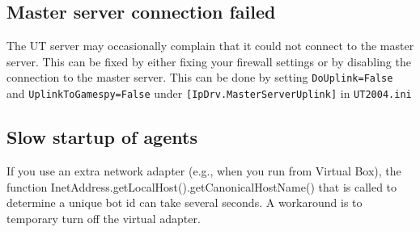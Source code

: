 \documentclass[11pt,a4paper]{article}
\begin{document}
\subsection{Master server connection failed}

The UT server may occasionally complain that it could not connect to the master server. This can be fixed by either fixing your firewall settings or by disabling the connection to the master server. This can be done by setting \verb|DoUplink=False| and  \verb|UplinkToGamespy=False| under \verb|[IpDrv.MasterServerUplink]| in \verb|UT2004.ini|

\subsection{Slow startup of agents}
If you use an extra network adapter (e.g., when you run from Virtual Box), the function InetAddress.getLocalHost().getCanonicalHostName() that is called to determine a unique bot id can take several seconds. A workaround is to temporary turn off the virtual adapter.



\end{document}
